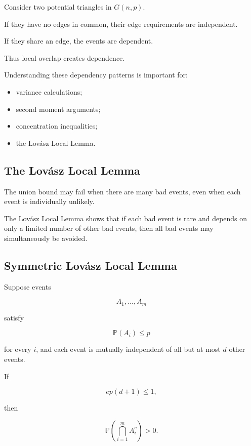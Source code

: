 Consider two potential triangles in \(G(n,p)\).

If they have no edges in common, their edge requirements are
independent.

If they share an edge, the events are dependent.

Thus local overlap creates dependence.

Understanding these dependency patterns is important for:

\begin{itemize}
    \item variance calculations;
    \item second moment arguments;
    \item concentration inequalities;
    \item the Lov\'asz Local Lemma.
\end{itemize}

\subsection{The Lov\'asz Local Lemma}
\label{subsec:lovasz-local-lemma}

The union bound may fail when there are many bad events, even when each
event is individually unlikely.

The Lov\'asz Local Lemma shows that if each bad event is rare and
depends on only a limited number of other bad events, then all bad
events may simultaneously be avoided.

\subsection{Symmetric Lov\'asz Local Lemma}
\label{subsec:symmetric-lovasz-local-lemma}

\begin{theorem}
Suppose events

\[
A_1,\ldots,A_m
\]

satisfy

\[
\mathbb{P}(A_i)\leq p
\]

for every \(i\), and each event is mutually independent of all but at
most \(d\) other events.

If

\[
\boxed{
e p(d+1)\leq1,
}
\]

then

\[
\boxed{
\mathbb{P}
\left(
\bigcap_{i=1}^{m}A_i^c
\right)
>0.
}
\]
\end{theorem}

